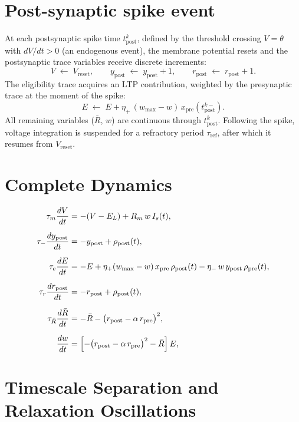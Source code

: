\documentclass[11pt]{article}
\theoremstyle{plain}
\theoremstyle{definition}
\begin{document}
\section{Post-synaptic spike event} \label{sec:post-spike}

At each postsynaptic spike time $t_{\mathrm{post}}^k$, defined by the threshold crossing $V = \theta$ with $dV/dt > 0$ (an endogenous event), the membrane potential resets and the postsynaptic trace variables receive discrete increments:
\[
    V \;\leftarrow\; V_{\mathrm{reset}}, \qquad
    y_{\mathrm{post}} \;\leftarrow\; y_{\mathrm{post}} + 1, \qquad
    r_{\mathrm{post}} \;\leftarrow\; r_{\mathrm{post}} + 1.
\]
The eligibility trace acquires an LTP contribution, weighted by the presynaptic trace at the moment of the spike:
\[
    E \;\leftarrow\; E + \eta_+\,(w_{\mathrm{max}} - w)\, x_{\mathrm{pre}}(t_{\mathrm{post}}^{k-}).
\]
All remaining variables ($\bar{R}$, $w$) are continuous through $t_{\mathrm{post}}^k$. Following the spike, voltage integration is suspended for a refractory period $\tau_{\mathrm{ref}}$, after which it resumes from $V_{\mathrm{reset}}$.
\section{Complete Dynamics} \label{sec:reduced_system}

\begin{align}
    \tau_m \frac{dV}{dt} &= -(V - E_L) + R_m\, w\, I_s(t), \label{eq:reduced_V} \\[6pt]
    \tau_- \frac{dy_{\mathrm{post}}}{dt} &= -y_{\mathrm{post}} + \rho_{\mathrm{post}}(t), \label{eq:reduced_ypost} \\[6pt]
    \tau_e \frac{dE}{dt} &= -E + \eta_+(w_{\mathrm{max}} - w)\, x_{\mathrm{pre}}\, \rho_{\mathrm{post}}(t) - \eta_-\, w\, y_{\mathrm{post}}\, \rho_{\mathrm{pre}}(t), \label{eq:reduced_E} \\[6pt]
    \tau_r \frac{dr_{\mathrm{post}}}{dt} &= -r_{\mathrm{post}} + \rho_{\mathrm{post}}(t), \label{eq:reduced_rpost} \\[6pt]
    \tau_{\bar{R}} \frac{d\bar{R}}{dt} &= -\bar{R} - \bigl(r_{\mathrm{post}} - \alpha\, r_{\mathrm{pre}}\bigr)^2, \label{eq:reduced_Rbar} \\[6pt]
    \frac{dw}{dt} &= \Bigl[-\bigl(r_{\mathrm{post}} - \alpha\, r_{\mathrm{pre}}\bigr)^2 - \bar{R}\Bigr]\, E, \label{eq:reduced_w}
\end{align}

\section{Timescale Separation and Relaxation Oscillations} \label{sec:oscillations}
\end{document}
